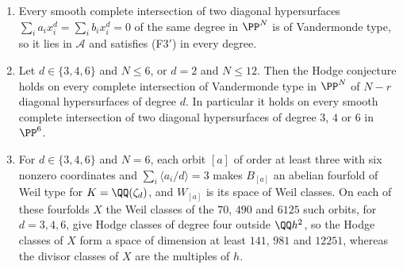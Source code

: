 \begin{corollary}\label{cor:twodiagonal}
\leavevmode
\begin{enumerate}[label=\textup{(\roman*)},leftmargin=2.6em,itemsep=2pt]
\item Every smooth complete intersection of two diagonal hypersurfaces
  $\sum_{i}a_{i}x_{i}^{d}=\sum_{i}b_{i}x_{i}^{d}=0$ of the same degree in
  $\PP^{N}$ is of Vandermonde type, so it lies in $\mathcal{A}$ and
  satisfies \textup{(F3$'$)} in every degree.
\item Let $d\in\{3,4,6\}$ and $N\le6$, or $d=2$ and $N\le12$. Then the
  Hodge conjecture holds on every complete intersection of Vandermonde type
  in $\PP^{N}$ of $N-r$ diagonal hypersurfaces of degree $d$. In particular
  it holds on every smooth complete intersection of two diagonal
  hypersurfaces of degree $3$, $4$ or $6$ in $\PP^{6}$.
\item For $d\in\{3,4,6\}$ and $N=6$, each orbit $[a]$ of order at least
  three with six nonzero coordinates and $\sum_{i}\langle a_{i}/d\rangle=3$ makes $B_{[a]}$ an
  abelian fourfold of Weil type for $K=\QQ(\zeta_{d})$, and $W_{[a]}$ is its
  space of Weil classes. On each of these fourfolds $X$ the Weil classes of
  the $70$, $490$ and $6125$ such orbits, for $d=3,4,6$, give Hodge classes of
  degree four outside $\QQ h^{2}$, so the Hodge classes of $X$ form a space of
  dimension at least $141$, $981$ and $12251$, whereas the divisor classes of
  $X$ are the multiples of $h$.
\end{enumerate}
\end{corollary}

